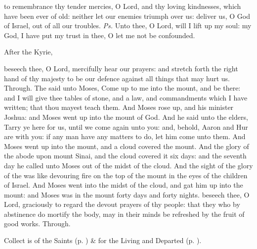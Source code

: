\introit
{} to remembrance thy tender mercies, O Lord, and thy loving kindnesses, which have been ever of old: neither let our enemies triumph over us: deliver us, O God of Israel, out of all our troubles. \textit{Ps.} Unto thee, O Lord, will I lift up my soul: my God, I have put my trust in thee, O let me not be confounded.
\begin{rubric}
    After the Kyrie,
\end{rubric}
\collect
{} beseech thee, O Lord, mercifully hear our prayers: and stretch forth the right hand of thy majesty to be our defence against all things that may hurt us. Through.
 The  said unto Moses, Come up to me into the mount, and be there: and I will give thee tables of stone, and a law, and commandments which I have written; that thou mayest teach them. And Moses rose up, and his minister Joshua: and Moses went up into the mount of God. And he said unto the elders, Tarry ye here for us, until we come again unto you: and, behold, Aaron and Hur are with you: if any man have any matters to do, let him come unto them. And Moses went up into the mount, and a cloud covered the mount. And the glory of the  abode upon mount Sinai, and the cloud covered it six days: and the seventh day he called unto Moses out of the midst of the cloud. And the sight of the glory of the  was like devouring fire on the top of the mount in the eyes of the children of Israel. And Moses went into the midst of the cloud, and gat him up into the mount: and Moses was in the mount forty days and forty nights.
{} beseech thee, O Lord, graciously to regard the devout prayers of thy people: that they who by abstinence do mortify the body, may in their minds be refreshed by the fruit of good works. Through.
\begin{rubric}
     Collect is of the Saints (p. \pageref{SPSaints}) \&  for the Living and Departed (p. \pageref{SPLivingDeparted}).
\end{rubric}
